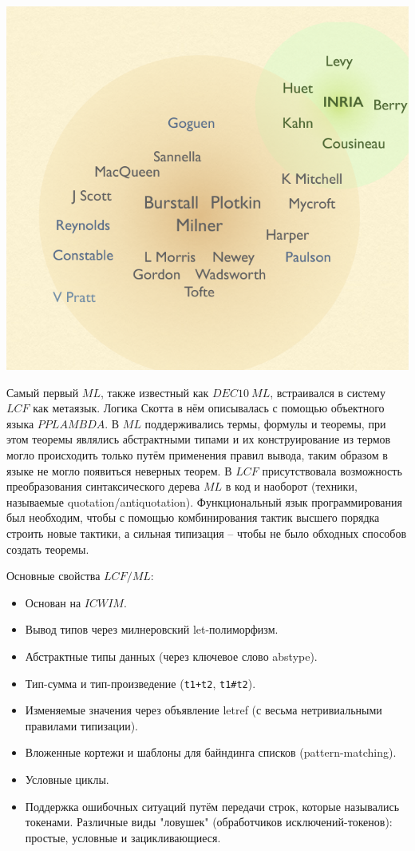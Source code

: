 \documentclass[14pt]{matmex-diploma-custom}
\begin{document}
\includegraphics[angle=0,scale=0.7]{two_circles.png}

Самый первый $M\!L$, также известный как $DEC10\ ML$, встраивался в систему $LCF$ как метаязык. Логика Скотта в нём описывалась с помощью объектного языка $PPLAMBDA$. В $M\!L$ поддерживались термы, формулы и теоремы, при этом теоремы являлись абстрактными типами и их конструирование из термов могло происходить только путём применения правил вывода, таким образом в языке не могло появиться неверных теорем. В $LCF$ присутствовала возможность преобразования синтаксического  дерева $M\!L$ в код и наоборот (техники, называемые quotation/antiquotation). Функциональный язык программирования был необходим, чтобы с помощью комбинирования тактик высшего порядка строить новые тактики, а сильная типизация -- чтобы не было обходных способов создать теоремы.

Основные свойства $LCF/ML$:
\begin{itemize}
  \item Основан на $ICW\!IM$.
  \item Вывод типов через милнеровский let-полиморфизм.
  \item Абстрактные типы данных (через ключевое слово abstype).
  \item Тип-сумма и тип-произведение (\verb=t1+t2=, \verb=t1#t2=).
  \item Изменяемые значения через объявление letref (с весьма нетривиальными правилами типизации).
  \item Вложенные кортежи и шаблоны для байндинга списков (pattern-matching).
  \item Условные циклы.
  \item Поддержка ошибочных ситуаций путём передачи строк, которые назывались токенами. Различные виды "ловушек" (обработчиков исключений-токенов): простые, условные и зацикливающиеся.
\end{itemize}
\end{document}
